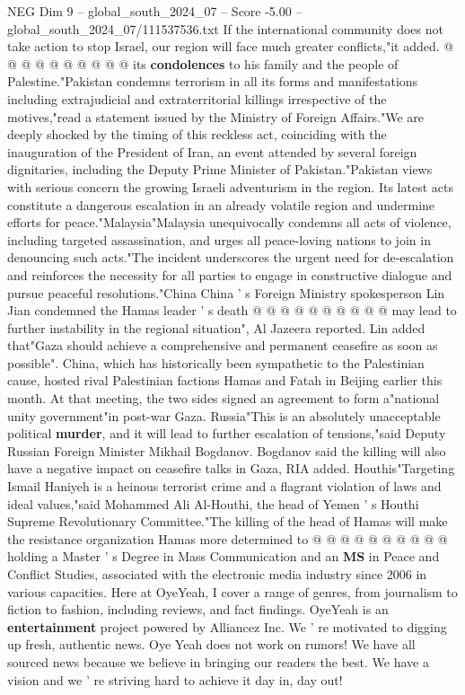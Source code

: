 \begin{textsample}{NEG Dim 9 – global\_south\_2024\_07 – Score -5.00 – global\_south\_2024\_07/111537536.txt}
If the international community does not take action to stop Israel, our region will face much greater conflicts,"it added. @ @ @ @ @ @ @ @ @ @ its \textbf{condolences} to his family and the people of Palestine."Pakistan condemns terrorism in all its forms and manifestations including extrajudicial and extraterritorial killings irrespective of the motives,"read a statement issued by the Ministry of Foreign Affairs."We are deeply shocked by the timing of this reckless act, coinciding with the inauguration of the President of Iran, an event attended by several foreign dignitaries, including the Deputy Prime Minister of Pakistan."Pakistan views with serious concern the growing Israeli adventurism in the region.
Its latest acts constitute a dangerous escalation in an already volatile region and undermine efforts for peace."Malaysia"Malaysia unequivocally condemns all acts of violence, including targeted assassination, and urges all peace-loving nations to join in denouncing such acts."The incident underscores the urgent need for de-escalation and reinforces the necessity for all parties to engage in constructive dialogue and pursue peaceful resolutions."China China ' s Foreign Ministry spokesperson Lin Jian condemned the Hamas leader ' s death @ @ @ @ @ @ @ @ @ @ may lead to further instability in the regional situation", Al Jazeera reported.
Lin added that"Gaza should achieve a comprehensive and permanent ceasefire as soon as possible".
China, which has historically been sympathetic to the Palestinian cause, hosted rival Palestinian factions Hamas and Fatah in Beijing earlier this month.
At that meeting, the two sides signed an agreement to form a"national unity government"in post-war Gaza.
Russia"This is an absolutely unacceptable political \textbf{murder}, and it will lead to further escalation of tensions,"said Deputy Russian Foreign Minister Mikhail Bogdanov.
Bogdanov said the killing will also have a negative impact on ceasefire talks in Gaza, RIA added.
Houthis"Targeting Ismail Haniyeh is a heinous terrorist crime and a flagrant violation of laws and ideal values,"said Mohammed Ali Al-Houthi, the head of Yemen ' s Houthi Supreme Revolutionary Committee."The killing of the head of Hamas will make the resistance organization Hamas more determined to @ @ @ @ @ @ @ @ @ @ holding a Master ' s Degree in Mass Communication and an \textbf{MS} in Peace and Conflict Studies, associated with the electronic media industry since 2006 in various capacities.
Here at OyeYeah, I cover a range of genres, from journalism to fiction to fashion, including reviews, and fact findings.
OyeYeah is an \textbf{entertainment} project powered by Alliancez Inc.
We ' re motivated to digging up fresh, authentic news.
Oye Yeah does not work on rumors!
We have all sourced news because we believe in bringing our readers the best.
We have a vision and we ' re striving hard to achieve it day in, day out!

\end{textsample}
